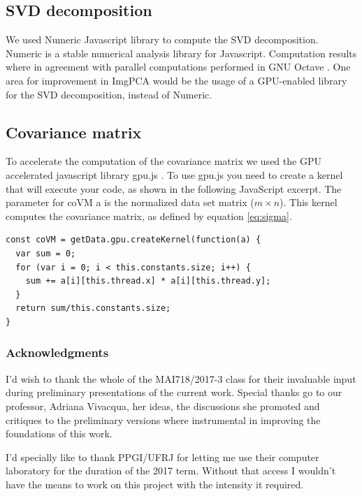 \documentclass{article} %
\begin{document}
\subsection{SVD decomposition}
We used Numeric \citep{Loisel:2012aa} Javascript library to compute the SVD decomposition. Numeric is a stable numerical analysis library for Javascript. Computation results where in agreement with parallel computations performed in GNU Octave \citep{Eaton:2018aa}. One area for improvement in ImgPCA would be the usage of a GPU-enabled library for the SVD decomposition, instead of Numeric.
\subsection{Covariance matrix}
To accelerate the computation of the covariance matrix we used the GPU accelerated javascript library gpu.js \citep{Sapuan:2017aa}. To use gpu.js you need to create a kernel that will execute your code, as shown in the following JavaScript excerpt. The parameter for coVM a is the normalized data set matrix ($m\times n$). This kernel computes the covariance matrix, as defined by equation \ref{eq:sigma}.
\begin{verbatim}
const coVM = getData.gpu.createKernel(function(a) {
  var sum = 0;
  for (var i = 0; i < this.constants.size; i++) {
    sum += a[i][this.thread.x] * a[i][this.thread.y];
  }
  return sum/this.constants.size;
}
\end{verbatim}
\subsubsection*{Acknowledgments}
I'd wish to thank the whole of the MAI718/2017-3 class for their invaluable input during preliminary presentations of the current work. Special thanks go to our professor, Adriana Vivacqua, her ideas, the discussions she promoted and critiques to the preliminary versions where instrumental in improving the foundations of this work. 

I'd specially like to thank PPGI/UFRJ for letting me use their computer laboratory for the duration of the 2017 term. Without that access I wouldn't have the means to work on this project with the intensity it required.
\pagebreak


\end{document}
